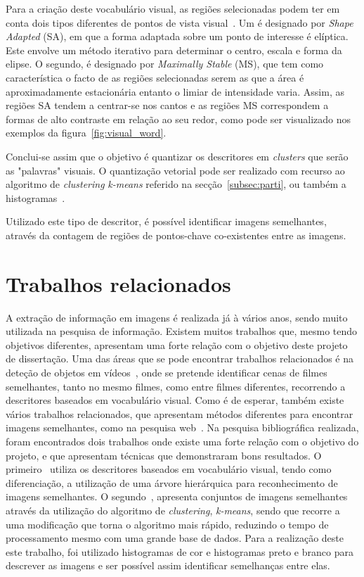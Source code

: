 Para a criação deste vocabulário visual, as regiões selecionadas podem ter em conta dois tipos diferentes de pontos de vista visual~\cite{Sivic2003, Sivic2006}. Um é designado por \textit{Shape Adapted} (SA), em que a forma adaptada sobre um ponto de interesse é elíptica. Este envolve um método iterativo para determinar o centro, escala e forma da elipse. O segundo, é designado por \textit{Maximally Stable} (MS), que tem como característica o facto de as regiões selecionadas serem as que a área é aproximadamente estacionária entanto o limiar de intensidade varia. Assim, as regiões SA tendem a centrar-se nos cantos e as regiões MS correspondem a formas de alto contraste em relação ao seu redor, como pode ser visualizado nos exemplos da figura~\ref{fig:visual_word}.

Conclui-se assim que o objetivo é quantizar os descritores em \textit{clusters} que serão as "palavras" visuais. O quantização vetorial pode ser realizado com recurso ao algoritmo de \textit{clustering} \textit{k-means} referido na secção~\ref{subsec:parti}, ou também a histogramas~\cite{Sivic2003, Sivic2006}.

Utilizado este tipo de descritor, é possível identificar imagens semelhantes, através da contagem de regiões de pontos-chave co-existentes entre as imagens. 

\section{Trabalhos relacionados} \label{sec:work}

A extração de informação em imagens é realizada já à vários anos, sendo muito utilizada na pesquisa de informação. Existem muitos trabalhos que, mesmo tendo objetivos diferentes, apresentam uma forte relação com o objetivo deste projeto de dissertação.
Uma das áreas que se pode encontrar trabalhos relacionados é na deteção de objetos em vídeos~\cite{Sivic2003, Sivic2006}, onde se pretende identificar cenas de filmes semelhantes, tanto no mesmo filmes, como entre filmes diferentes, recorrendo a descritores baseados em vocabulário visual.
Como é de esperar, também existe vários trabalhos relacionados, que apresentam métodos diferentes para encontrar imagens semelhantes, como na pesquisa web~\cite{Cai2004, Gao2005}.
Na pesquisa bibliográfica realizada, foram encontrados dois trabalhos onde existe uma forte relação com o objetivo do projeto, e que apresentam técnicas que demonstraram bons resultados. O primeiro~\cite{Nister2006} utiliza os descritores baseados em vocabulário visual, tendo como diferenciação, a utilização de uma árvore hierárquica para reconhecimento de imagens semelhantes. O segundo~\cite{Lin2014}, apresenta conjuntos de imagens semelhantes através da utilização do algoritmo de \textit{clustering}, \textit{k-means}, sendo que recorre a uma modificação que torna o algoritmo mais rápido, reduzindo o tempo de processamento mesmo com uma grande base de dados. Para a realização deste este trabalho, foi utilizado histogramas de cor e histogramas preto e branco para descrever as imagens e ser possível assim identificar semelhanças entre elas.

